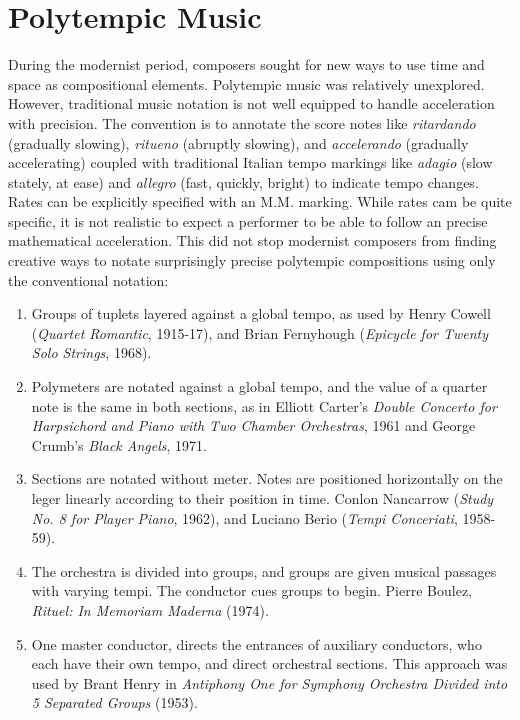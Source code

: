 \section{Polytempic Music}
\label{sec:background-polytempi}
During the modernist period, composers sought for new ways to use time
and space as compositional elements. Polytempic music was relatively
unexplored. However, traditional music notation is not well equipped
to handle acceleration with precision. The convention is to annotate
the score notes like \textit{ritardando} (gradually slowing),
\textit{ritueno} (abruptly slowing), and \textit{accelerando}
(gradually accelerating) coupled with traditional Italian tempo
markings like \textit{adagio} (slow stately, at ease) and
\textit{allegro} (fast, quickly, bright) to indicate tempo
changes. Rates can be explicitly specified with an M.M. marking. While rates cam
be quite specific, it is not realistic to expect a performer to be
able to follow an precise mathematical acceleration. This did not stop
modernist composers from finding creative ways to notate surprisingly
precise polytempic compositions using only the conventional notation:
\begin{enumerate}
\item Groups of tuplets layered against a global tempo, as used by
  Henry Cowell (\textit{Quartet Romantic}, 1915-17), and Brian Fernyhough
  (\textit{Epicycle for Twenty Solo Strings}, 1968).
\item Polymeters are notated against a global tempo, and the value of
  a quarter note is the same in both sections, as in Elliott Carter's \textit{Double
    Concerto for Harpsichord and Piano with Two Chamber Orchestras}, 1961
  and George Crumb's \textit{Black Angels}, 1971.
\item Sections are notated without meter. Notes are positioned
  horizontally on the leger linearly according to their position in
  time. Conlon Nancarrow (\textit{Study No. 8 for Player Piano},
  1962), and Luciano Berio (\textit{Tempi Conceriati}, 1958-59).
\item The orchestra is divided into groups, and groups are given
  musical passages with varying tempi. The conductor cues groups to
  begin. Pierre Boulez, \textit{Rituel: In Memoriam Maderna} (1974).
\item One master conductor, directs the entrances of auxiliary
  conductors, who each have their own tempo, and direct orchestral
  sections. This approach was used by Brant Henry in \textit{Antiphony
    One for Symphony Orchestra Divided into 5 Separated Groups} (1953).
\end{enumerate}

